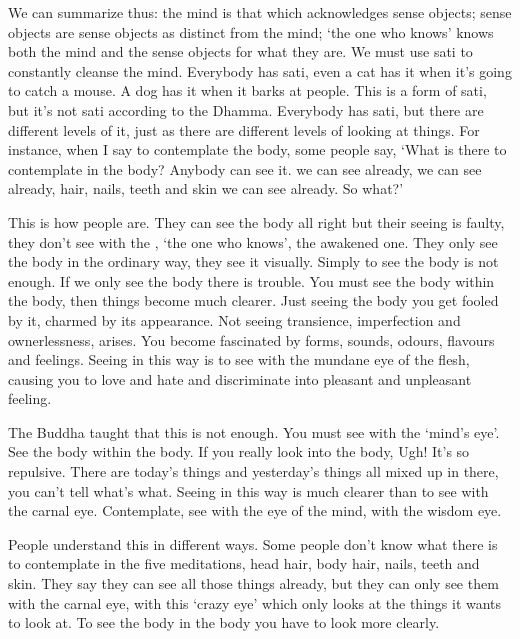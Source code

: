 We can summarize thus: the mind is that which acknowledges sense objects; sense objects are sense objects as distinct from the mind; `the one who knows' knows both the mind and the sense objects for what they are. We must use sati to constantly cleanse the mind. Everybody has sati, even a cat has it when it's going to catch a mouse. A dog has it when it barks at people. This is a form of sati, but it's not sati according to the Dhamma. Everybody has sati, but there are different levels of it, just as there are different levels of looking at things. For instance, when I say to contemplate the body, some people say, `What is there to contemplate in the body? Anybody can see it.  we can see already,  we can see already, hair, nails, teeth and skin we can see already. So what?'

This is how people are. They can see the body all right but their seeing is faulty, they don't see with the , `the one who knows', the awakened one. They only see the body in the ordinary way, they see it visually. Simply to see the body is not enough. If we only see the body there is trouble. You must see the body within the body, then things become much clearer. Just seeing the body you get fooled by it, charmed by its appearance. Not seeing transience, imperfection and ownerlessness,  arises. You become fascinated by forms, sounds, odours, flavours and feelings. Seeing in this way is to see with the mundane eye of the flesh, causing you to love and hate and discriminate into pleasant and unpleasant feeling.

The Buddha taught that this is not enough. You must see with the `mind's eye'. See the body within the body. If you really look into the body, Ugh! It's so repulsive. There are today's things and yesterday's things all mixed up in there, you can't tell what's what. Seeing in this way is much clearer than to see with the carnal eye. Contemplate, see with the eye of the mind, with the wisdom eye.

People understand this in different ways. Some people don't know what there is to contemplate in the five meditations, head hair, body hair, nails, teeth and skin. They say they can see all those things already, but they can only see them with the carnal eye, with this `crazy eye' which only looks at the things it wants to look at. To see the body in the body you have to look more clearly.

